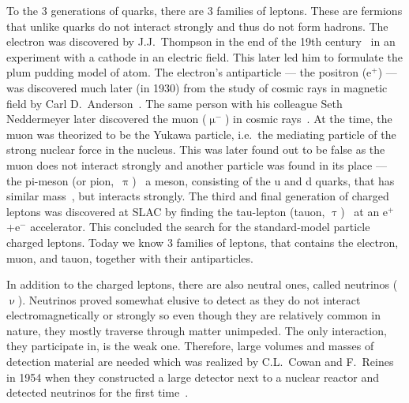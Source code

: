 To the 3 generations of quarks, there are 3 families of leptons. These are fermions that unlike quarks do not interact strongly and thus do not form hadrons. The electron was discovered by J.J.\ Thompson in the end of the 19th century~\cite{thomson1897cathode} in an experiment with a cathode in an electric field\@. This later led him to formulate the plum pudding model of atom. The electron's antiparticle --- the positron (e$^+$) --- was discovered much later (in 1930) from the study of cosmic rays in magnetic field by Carl D.\ Anderson~\cite{positron}\@. The same person with his colleague Seth Neddermeyer later discovered the muon ($\upmu^-$) in cosmic rays~\cite{muon}\@. At the time, the muon was theorized to be the Yukawa particle, i.e.\ the mediating particle of the strong nuclear force in the nucleus. This was later found out to be false as the muon does not interact strongly and another particle was found in its place --- the pi-meson (or pion,~$\uppi$)~\cite{pion} a meson, consisting of the u and d quarks, that has similar mass~\cite{PDG}, but interacts strongly. The third and final generation of charged leptons was discovered at SLAC by finding the tau-lepton (tauon, $\uptau$)~\cite{tau} at an e$^+$+e$^-$ accelerator\@. This concluded the search for the standard-model particle charged leptons. Today we know 3 families of leptons, that contains the electron, muon, and tauon, together with their antiparticles.

In addition to the charged leptons, there are also neutral ones, called neutrinos ($\upnu$)\@. %
Neutrinos proved somewhat elusive to detect as they do not interact electromagnetically or strongly so even though they are relatively common in nature, they mostly traverse through matter unimpeded. The only interaction, they participate in, is the weak one. Therefore, large volumes and masses of detection material are needed which was realized by C.L.\ Cowan and F.\ Reines in 1954 when they constructed a large detector next to a nuclear reactor and detected neutrinos for the first time~\cite{CowanNeutrinos}\@.

